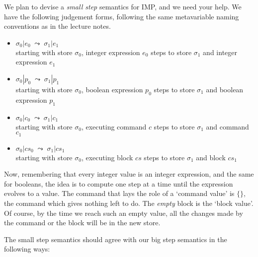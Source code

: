 \documentclass{article}
\begin{document}
\newcommand{\execJ}[3]{#1 \,|\, #2 \Downarrow #3}
\newcommand{\cs}{\mathit{cs}}
\newcommand{\cmp}{\mathit{cmp}}
\newcommand{\fbx}[1]{\framebox{\ensuremath{#1}}}



\newcommand{\ssj}[4]{#1|#2 \;\leadsto\; #3|#4}

 We plan to devise a \emph{small step} semantics for IMP, and we need
your help. We have the following judgement forms, following the same metavariable naming
conventions as in the lecture notes.

\begin{itemize}
\item $\ssj{\sigma_0}{e_0}{\sigma_1}{e_1}$\\
  starting with store $\sigma_0$, integer expression $e_0$ steps to store $\sigma_1$ and integer expression $e_1$
\item $\ssj{\sigma_0}{p_0}{\sigma_1}{p_1}$\\
  starting with store $\sigma_0$, boolean expression $p_0$ steps to
  store $\sigma_1$ and boolean expression $p_1$
\item $\ssj{\sigma_0}{c_0}{\sigma_1}{c_1}$\\
  starting with store $\sigma_0$, executing command $c$ steps to store
  $\sigma_1$ and command $c_1$
\item $\ssj{\sigma_0}{\cs_0}{\sigma_1}{\cs_1}$\\
  starting with store $\sigma_0$, executing block $\cs$ steps to store
  $\sigma_1$ and block $\cs_1$
\end{itemize}

Now, remembering that every integer value is an integer expression, and the same for booleans,
the idea is to compute one step at a time until the expression evolves to a value. The
command that lays the role of a `command value' is $\{\}$, the command which gives nothing
left to do. The \emph{empty} block is the `block value'. Of course, by the time we reach
such an empty value, all the changes made by the command or the block will be in the new
store.

The small step semantics should agree with our big step semantics in
the following ways:
\end{document}
